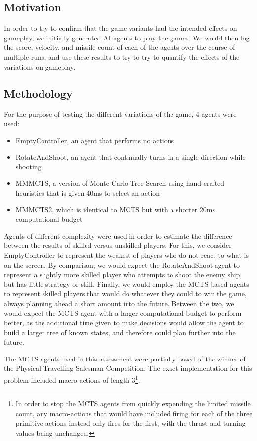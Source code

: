 \subsection{Motivation}

In order to try to confirm that the game variants had the intended effects on gameplay, we initially generated AI agents to play the games. We would then log the score, velocity, and missile count of each of the agents over the course of multiple runs, and use these results to try to try to quantify the effects of the variations on gameplay.

\subsection{Methodology}

For the purpose of testing the different variations of the game, 4 agents were used:
\begin{itemize}
	\item EmptyController, an agent that performs no actions
	\item RotateAndShoot, an agent that continually turns in a single direction while shooting
	\item MMMCTS, a version of Monte Carlo Tree Search using hand-crafted heuristics that is given 40ms to select an action
	\item MMMCTS2, which is identical to MCTS but with a shorter 20ms computational budget
\end{itemize}

Agents of different complexity were used in order to estimate the difference between the results of skilled versus unskilled players. For this, we consider EmptyController to represent the weakest of players who do not react to what is on the screen. By comparison, we would expect the RotateAndShoot agent to represent a slightly more skilled player who attempts to shoot the enemy ship, but has little strategy or skill. Finally, we would employ the MCTS-based agents to represent skilled players that would do whatever they could to win the game, always planning ahead a short amount into the future. Between the two, we would expect the MCTS agent with a larger computational budget to perform better, as the additional time given to make decisions would allow the agent to build a larger tree of known states, and therefore could plan further into the future.

The MCTS agents used in this assessment were partially based of the winner of the Physical Travelling Salesman Competition\cite{6374161}. The exact implementation for this problem included macro-actions of length 3\footnote{In order to stop the MCTS agents from quickly expending the limited missile count, any macro-actions that would have included firing for each of the three primitive actions instead only fires for the first, with the thrust and turning values being unchanged.}. 

